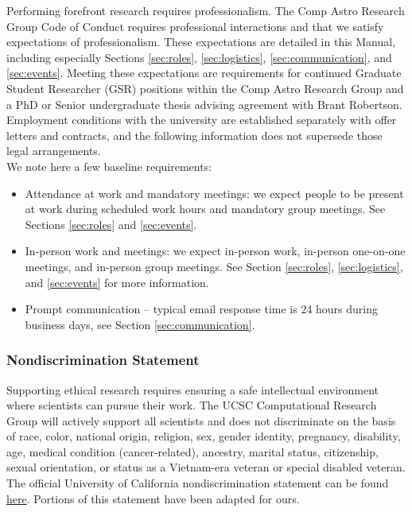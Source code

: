 Performing forefront research requires professionalism. The Comp Astro Research Group Code of Conduct requires professional interactions and that we satisfy expectations of professionalism. These expectations are detailed in this Manual, including especially Sections \ref{sec:roles}, \ref{sec:logistics}, \ref{sec:communication}, and \ref{sec:events}. Meeting these expectations
are requirements for continued Graduate Student Researcher (GSR) positions within the Comp Astro Research Group
and a PhD or Senior undergraduate thesis advising agreement with Brant Robertson. Employment conditions with 
the university are established separately with offer letters and contracts, and the following information
does not supersede those legal arrangements.\\

\noindent
We note here a few baseline requirements:

\begin{itemize}
	\item Attendance at work and mandatory meetings: we expect people to be present at work during scheduled work hours and mandatory group meetings. See Sections \ref{sec:roles} and \ref{sec:events}.
	\item In-person work and meetings: we expect in-person work, in-person one-on-one meetings, and in-person group meetings. See Section \ref{sec:roles}, \ref{sec:logistics}, and \ref{sec:events} for more information.
	\item Prompt communication -- typical email response time is 24 hours during business days, see Section \ref{sec:communication}.
\end{itemize}



\subsubsection{Nondiscrimination Statement}

Supporting ethical research requires ensuring a safe intellectual
environment where scientists can pursue their work. The UCSC
Computational Research Group will actively support all scientists
and does not discriminate on the 
basis of race, color, national origin, religion, sex, gender identity,
pregnancy, disability, age, medical condition (cancer-related), ancestry,
marital status, citizenship, sexual orientation, or status as a Vietnam-era
veteran or special disabled veteran.\\

\noindent
The official University of California nondiscrimination statement can
be found \href{https://www.ucop.edu/operating-budget/fees-and-enrollments/policies-and-resources/nondiscrimination-statement.html}{here}. Portions of this statement have been 
adapted for ours.

